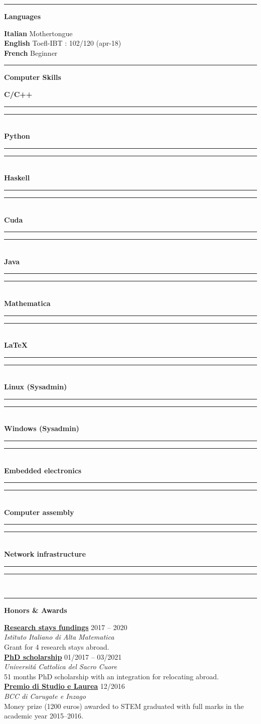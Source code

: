\documentclass[a4paper]{article}
\newcommand{\crule}[3][black]{\textcolor{#1}{\rule{#2}{#3}}}
\newcommand{\progbar}[4][black]{\crule[#1]{#3}{#4}\crule[#1!10!white!90]{#2}{#4}}
\newcommand{\block}[1]{\hrule \vspace{0.2cm} \textbf{\Large #1} \vspace{0.2cm}}
\newcommand{\voice}[5]{\href{#4}{\textbf{#1}} \hfill #2 \\ \textit{#3} \\ {\small #5} \vspace{0.2cm} \\}
\newcommand{\skill}[2]{\textbf{#1} \hfill #2 \\}
\newcommand{\skillbar}[4]{\textbf{#1} \hfill \progbar{#2}{#3}{#4} \\}
\begin{document}
\hfill
\begin{minipage}[t]{0.375\columnwidth}
    

    \block{Languages} 
    
    
    \skill{Italian}{Mothertongue}
    \skill{English}{Toefl-IBT : 102/120 (apr-18)}
    \skill{French}{Beginner}
        





    \block{Computer Skills} 
    
    
    \skillbar{C/C++}
    {1.4cm}
    {0.6cm}
    {0.25cm}
    \skillbar{Python}
    {1.1cm}
    {0.9cm}
    {0.25cm}
    \skillbar{Haskell}
    {1.5cm}
    {0.5cm}
    {0.25cm}
    \skillbar{Cuda}
    {1.1cm}
    {0.9cm}
    {0.25cm}
    \skillbar{Java}
    {1.2cm}
    {0.8cm}
    {0.25cm}
    \skillbar{Mathematica}
    {1.4cm}
    {0.6cm}
    {0.25cm}
    \skillbar{\LaTeX}
    {0.5cm}
    {1.5cm}
    {0.25cm}
    \skillbar{Linux (Sysadmin)}
    {0.7cm}
    {1.3cm}
    {0.25cm}
    \skillbar{Windows (Sysadmin)}
    {0.7cm}
    {1.3cm}
    {0.25cm}
    \skillbar{Embedded electronics}
    {1.5cm}
    {0.5cm}
    {0.25cm}
    \skillbar{Computer assembly}
    {1.0cm}
    {1.0cm}
    {0.25cm}
    \skillbar{Network infrastructure}
    {1.6cm}
    {0.4cm}
    {0.25cm}





    \block{Honors \& Awards}
    
    \voice{Research stays fundings}
    		{2017 -- 2020}
    		{Istituto Italiano di Alta Matematica}
    		{https://www.altamatematica.it/gnsaga/attivita/partecipazione-a-convegni-scuole-e-workshop-missioni/}
    		{Grant for 4 research stays abroad.}
    \voice{PhD scholarship}
        {01/2017 -- 03/2021}
        {Universit\'a Cattolica del Sacro Cuore}
        {https://www.dropbox.com/s/pmsg20xsxd6x5yf/External_Scholarship.pdf?dl=0}       
        {51 months PhD scholarship with an integration for relocating abroad.}
    \voice{Premio di Studio e Laurea}
        {12/2016}
        {BCC di Carugate e Inzago}
        {https://web.archive.org/web/20191207203437/https://www.bccmilano.it/news/dettaglio_news_div.asp?i_menuID=54872&hNewsID=132411}       
        {Money prize (1200 euros) awarded to STEM graduated with full marks in the academic year 2015--2016.}




    









\end{minipage}
\end{document}
